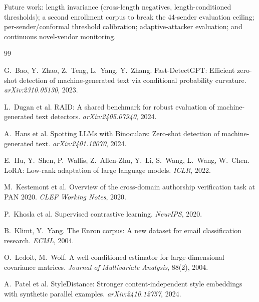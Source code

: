 \documentclass[11pt]{article}
\begin{document}
Future work: length invariance (cross-length negatives, length-conditioned thresholds); a second
enrollment corpus to break the 44-sender evaluation ceiling; per-sender/conformal threshold
calibration; adaptive-attacker evaluation; and continuous novel-vendor monitoring.

\begin{thebibliography}{99}\small

G.~Bao, Y.~Zhao, Z.~Teng, L.~Yang, Y.~Zhang.
\newblock Fast-DetectGPT: Efficient zero-shot detection of machine-generated text via conditional
probability curvature.
\newblock \emph{arXiv:2310.05130}, 2023.

L.~Dugan et al.
\newblock RAID: A shared benchmark for robust evaluation of machine-generated text detectors.
\newblock \emph{arXiv:2405.07940}, 2024.

A.~Hans et al.
\newblock Spotting LLMs with Binoculars: Zero-shot detection of machine-generated text.
\newblock \emph{arXiv:2401.12070}, 2024.

E.~Hu, Y.~Shen, P.~Wallis, Z.~Allen-Zhu, Y.~Li, S.~Wang, L.~Wang, W.~Chen.
\newblock LoRA: Low-rank adaptation of large language models.
\newblock \emph{ICLR}, 2022.

M.~Kestemont et al.
\newblock Overview of the cross-domain authorship verification task at PAN 2020.
\newblock \emph{CLEF Working Notes}, 2020.

P.~Khosla et al.
\newblock Supervised contrastive learning.
\newblock \emph{NeurIPS}, 2020.

B.~Klimt, Y.~Yang.
\newblock The Enron corpus: A new dataset for email classification research.
\newblock \emph{ECML}, 2004.

O.~Ledoit, M.~Wolf.
\newblock A well-conditioned estimator for large-dimensional covariance matrices.
\newblock \emph{Journal of Multivariate Analysis}, 88(2), 2004.

A.~Patel et al.
\newblock StyleDistance: Stronger content-independent style embeddings with synthetic parallel
examples.
\newblock \emph{arXiv:2410.12757}, 2024.


\end{thebibliography}
\end{document}
